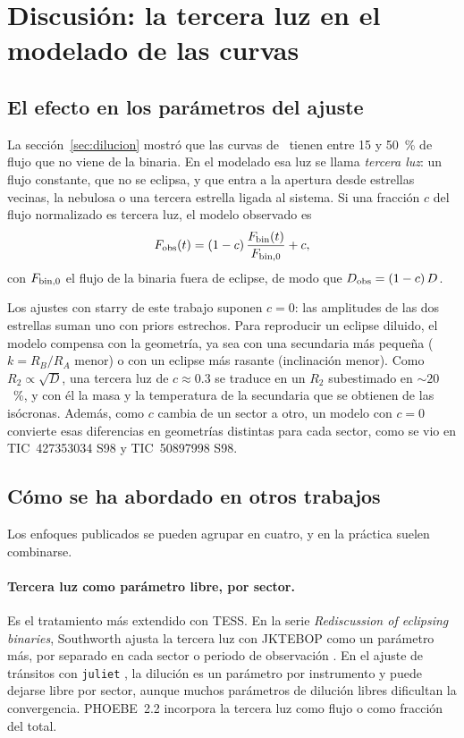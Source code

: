 \section{Discusión: la tercera luz en el modelado de las curvas}
\label{sec:tercera_luz}

\subsection{El efecto en los parámetros del ajuste}
La sección~\ref{sec:dilucion} mostró que las curvas de \tx\ tienen entre 15 y 50~\% de flujo que no viene
de la binaria. En el modelado esa luz se llama \emph{tercera luz}: un flujo constante, que no se eclipsa,
y que entra a la apertura desde estrellas vecinas, la nebulosa o una tercera estrella ligada al sistema.
Si una fracción $c$ del flujo normalizado es tercera luz, el modelo observado es
\begin{equation}
F_{\rm obs}(t)=(1-c)\,\frac{F_{\rm bin}(t)}{F_{\rm bin,0}}+c,
\label{eq:tercera_luz}
\end{equation}
con $F_{\rm bin,0}$ el flujo de la binaria fuera de eclipse, de modo que $D_{\rm obs}=(1-c)\,D$.

Los ajustes con starry de este trabajo suponen $c=0$: las amplitudes de las dos estrellas suman uno con
priors estrechos. Para reproducir un eclipse diluido, el modelo compensa con la geometría, ya sea con una
secundaria más pequeña ($k=R_B/R_A$ menor) o con un eclipse más rasante (inclinación menor). Como
$R_2\propto\sqrt{D}$, una tercera luz de $c\approx0.3$ se traduce en un $R_2$ subestimado en $\sim20$~\%,
y con él la masa y la temperatura de la secundaria que se obtienen de las isócronas. Además, como $c$
cambia de un sector a otro, un modelo con $c=0$ convierte esas diferencias en geometrías distintas para cada
sector, como se vio en TIC~427353034 S98 y TIC~50897998 S98.

\subsection{Cómo se ha abordado en otros trabajos}
Los enfoques publicados se pueden agrupar en cuatro, y en la práctica suelen combinarse.

\paragraph{Tercera luz como parámetro libre, por sector.} Es el tratamiento más extendido con TESS.
En la serie \emph{Rediscussion of eclipsing binaries}, Southworth ajusta la tercera luz con JKTEBOP como
un parámetro más, por separado en cada sector o periodo de observación \citep[por ejemplo,][]{Southworth2024CWEri}.
En el ajuste de tránsitos con \texttt{juliet} \citep{Espinoza2019}, la dilución es un parámetro por instrumento
y puede dejarse libre por sector, aunque muchos parámetros de dilución libres dificultan la convergencia.
PHOEBE~2.2 \citep{Jones2020} incorpora la tercera luz como flujo o como fracción del total.


